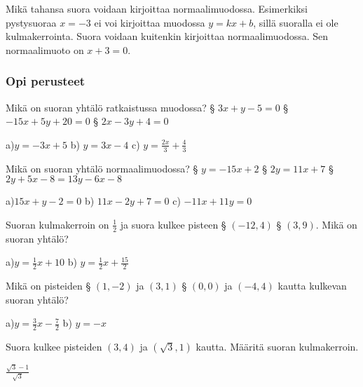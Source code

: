Mikä tahansa suora voidaan kirjoittaa normaalimuodossa. Esimerkiksi pystysuoraa $x=-3$ ei voi kirjoittaa muodossa $y=kx+b$, sillä suoralla ei ole kulmakerrointa. Suora voidaan kuitenkin kirjoittaa normaalimuodossa. Sen normaalimuoto on $x+3=0$.

\begin{tehtavasivu}

\subsubsection*{Opi perusteet}

\begin{tehtava}
Mikä on suoran yhtälö ratkaistussa muodossa?
\alakohdat
§ $3x + y -5 = 0$
§ $-15x + 5y + 20 =0$
§ $2x - 3y + 4 = 0$
\loppu
\begin{vastaus}
a)$y=-3x+5$ b) $y=3x-4$ c) $y=\frac{2x}{3} + \frac{4}{3}$
\end{vastaus}
\end{tehtava}

\begin{tehtava}
Mikä on suoran yhtälö normaalimuodossa?
\alakohdat
§ $y=-15x+2$
§ $2y=11x+7$
§ $2y+5x-8=13y-6x-8$
\loppu
\begin{vastaus}
a)$15x+y-2=0$ b) $11x-2y+7=0$ c) $-11x+11y=0$
\end{vastaus}
\end{tehtava}

\begin{tehtava}
Suoran kulmakerroin on $\frac{1}{2}$ ja suora kulkee pisteen
\alakohdat
§ $(-12, 4)$
§ $(3, 9)$. Mikä on suoran yhtälö?
\loppu
\begin{vastaus}
a)$y=\frac{1}{2}x+10$ b) $y=\frac{1}{2}x+\frac{15}{2}$
\end{vastaus}
\end{tehtava}

\begin{tehtava}
Mikä on pisteiden
\alakohdat
§ $(1, -2)$ ja $(3, 1)$
§ $(0, 0)$ ja $(-4, 4)$ kautta kulkevan suoran yhtälö?
\loppu
\begin{vastaus}
a)$y=\frac{3}{2}x-\frac{7}{2}$ b) $y=-x$
\end{vastaus}
\end{tehtava}

\begin {tehtava}
Suora kulkee pisteiden $(3, 4)$ ja $(\sqrt{3}, 1)$ kautta. Määritä suoran kulmakerroin.
\begin {vastaus}
$\frac{\sqrt{3}-1}{\sqrt{3}}$
\end {vastaus}
\end {tehtava}


\end{tehtavasivu}

